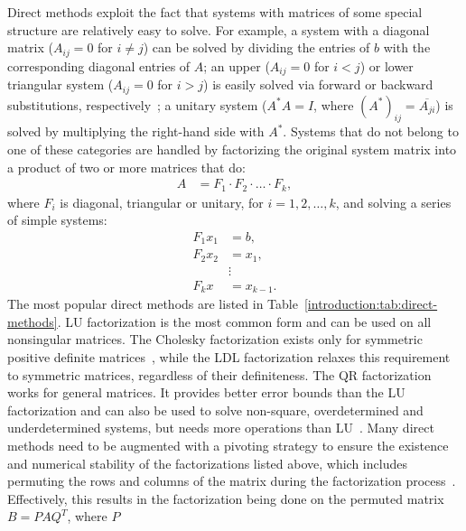 Direct methods exploit the fact that systems with matrices of some special
structure are relatively easy to solve. For example, a system with a diagonal
matrix ($A_{ij} = 0$ for $i \neq j$) can be solved by dividing the entries of
$b$ with the corresponding diagonal entries of $A$; an upper ($A_{ij} = 0$ for
$i < j$) or lower triangular system ($A_{ij} = 0$ for $i > j$) is easily solved
via forward or backward substitutions, respectively~\cite{demmel,Ipsen2009}; a
unitary system ($A^* A = I$, where $(A^*)_{ij} = \overline{A_{ji}}$)
is solved by multiplying the right-hand side with $A^*$. 
Systems that do not belong to one of these categories are handled by
factorizing the original system matrix into a product of two or more matrices
that do:
\begin{align}
    A &= F_1 \cdot F_2 \cdot \ldots \cdot F_k,
\end{align}
where $F_i$ is diagonal, triangular or unitary, for $i = 1,2, \ldots, k$, and
solving a series of simple systems:
\begin{align}
    F_1 x_1 &= b,\\
    F_2 x_2 &= x_1,\\
    &\vdots \nonumber \\
    F_k x &= x_{k-1}.
\end{align}
The most popular direct methods are listed in
Table~\ref{introduction:tab:direct-methods}. LU factorization is the most common
form and can be used on all nonsingular matrices. The Cholesky factorization
exists only for symmetric positive definite matrices~\cite{demmel}, while the
LDL factorization relaxes this requirement to symmetric matrices, regardless of
their definiteness. The QR factorization works for general matrices. It provides
better error bounds than the LU factorization and can also be used to solve
non-square, overdetermined and underdetermined systems, but needs more
operations than LU~\cite{demmel}.  Many direct methods need to be augmented with
a pivoting strategy to ensure the existence and numerical stability of the
factorizations listed above, which includes permuting the rows and columns of
the matrix during the
factorization process~\cite{demmel,duff}.  
Effectively, this results
in the factorization being done on the permuted matrix $B = P A Q^T$, where $P$
